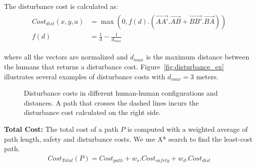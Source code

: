 The disturbance cost is calculated as:
\begin{align} 
\begin{split} 
Cost_{dist}(x,y,a)&=\max(0, f(d).(\vec{AA'}.\vec{AB}+\vec{BB'}.\vec{BA})) \\
f(d)&=\frac{1}{d}-\frac{1}{d_{max}}
\end{split} 
\end{align}

where all the vectors are normalized and $d_{max}$ is the maximum distance between the humans that returns a disturbance cost. Figure~\ref{fig:disturbance_ex} illustrates several examples of disturbance costs with $d_{max}=3$ meters.

\begin{figure}[ht!]
\centering
%
    \caption{%
	Disturbance costs in different human-human configurations and distances. A path that crosses the dashed lines incurs the disturbance cost calculated on the right side.
     }%
   \label{fig:sim}
   \vspace{-0.2cm}
\end{figure}



\textbf{Total Cost:} The total cost of a path $P$ is computed with a weighted average of path length, safety and disturbance costs. We use A* search to find the least-cost path.
\begin{align}
Cost_{Total}(P) = Cost_{path}+w_{s}.Cost_{safety} + w_d.Cost_{dist}
\end{align}

